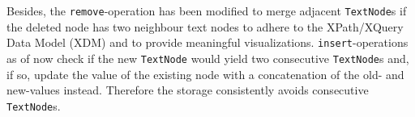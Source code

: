 



Besides, the \texttt{remove}-operation has been modified to merge adjacent \texttt{TextNode}s if the deleted node has two neighbour text nodes to adhere to the XPath/XQuery Data Model (XDM) and to provide meaningful visualizations. \texttt{insert}-operations as of now check if the new \texttt{TextNode} would yield two consecutive \texttt{TextNode}s and, if so, update the value of the existing node with a concatenation of the old- and new-values instead. Therefore the storage consistently avoids consecutive \texttt{TextNode}s. 

